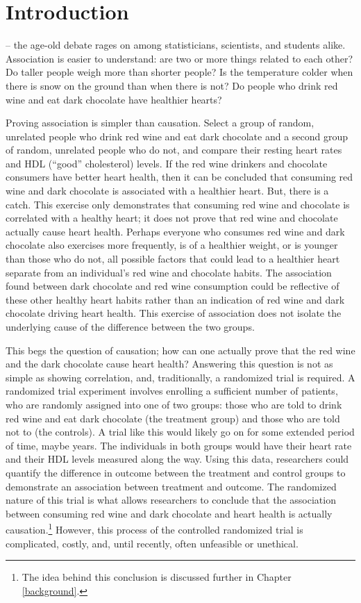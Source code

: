 \chapter{Introduction}
\label{introduction}

 -- the age-old debate rages on among statisticians, scientists, and students alike.  Association is easier to understand: are two or more things related to each other?  Do taller people weigh more than shorter people?  Is the temperature colder when there is snow on the ground than when there is not?  Do people who drink red wine and eat dark chocolate have healthier hearts? 

Proving association is simpler than causation.  Select a group of random, unrelated people who drink red wine and eat dark chocolate and a second group of random, unrelated people who do not, and compare their resting heart rates and HDL (``good'' cholesterol) levels.  If the red wine drinkers and chocolate consumers have better heart health, then it can be concluded that consuming red wine and dark chocolate is associated with a healthier heart.  But, there is a catch.  This exercise only demonstrates that consuming red wine and chocolate is correlated with a healthy heart; it does not prove that red wine and chocolate actually cause heart health.  Perhaps everyone who consumes red wine and dark chocolate also exercises more frequently, is of a healthier weight, or is younger than those who do not, all possible factors that could lead to a healthier heart separate from an individual's red wine and chocolate habits.  The association found between dark chocolate and red wine consumption could be reflective of these other healthy heart habits rather than an indication of red wine and dark chocolate driving heart health.  This exercise of association does not isolate the underlying cause of the difference between the two groups. 
 
This begs the question of causation; how can one actually prove that the red wine and the dark chocolate cause heart health?  Answering this question is not as simple as showing correlation, and, traditionally, a randomized trial is required.  A randomized trial experiment involves enrolling a sufficient number of patients, who are randomly assigned into one of two groups: those who are told to drink red wine and eat dark chocolate (the treatment group) and those who are told not to (the controls).  A trial like this would likely go on for some extended period of time, maybe years.  The individuals in both groups would have their heart rate and their HDL levels measured along the way.  Using this data, researchers could quantify the difference in outcome between the treatment and control groups to demonstrate an association between treatment and outcome.  The randomized nature of this trial is what allows researchers to conclude that the association between consuming red wine and dark chocolate and heart health is actually causation.\footnote{The idea behind this conclusion is discussed further in Chapter \ref{background}.} However, this process of the controlled randomized trial is complicated, costly, and, until recently, often unfeasible or unethical.  
 
